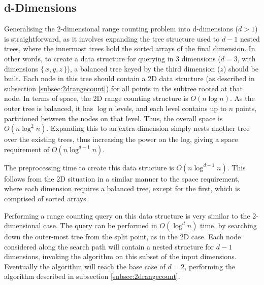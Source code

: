 \documentclass[paper=a4, fontsize=12pt]{article}
\begin{document}
\subsection{d-Dimensions}
\label{subsec:ddrangecount}

Generalising the 2-dimensional range counting problem into d-dimensions (\(d >
1\)) is straightforward, as it involves expanding the tree structure used to
\(d-1\) nested trees, where the innermost trees hold the sorted arrays of the
final dimension. In other words, to create a data structure for querying in 3
dimensions (\(d = 3\), with dimensions \(\{\,x,y,z\,\}\)), a balanced tree keyed
by the third dimension (\(z\)) should be built. Each node in this tree should
contain a 2D data structure (as described in subsection
\ref{subsec:2drangecount}) for all points in the subtree rooted at that node. In
terms of space, the 2D range counting structure is \(O(n \log n)\). As the outer
tree is balanced, it has \(\log n\) levels, and each level contains up to \(n\)
points, partitioned between the nodes on that level. Thus, the overall space is
\(O(n \log^2 n)\). Expanding this to an extra dimension simply nests another
tree over the existing trees, thus increasing the power on the log, giving a
space requirement of \(O(n \log^{d-1} n)\).

The preprocessing time to create this data structure is \(O(n \log^{d-1}
n)\). This follows from the 2D situation in a similar manner to the space
requirement, where each dimension requires a balanced tree, except for the
first, which is comprised of sorted arrays.

Performing a range counting query on this data structure is very similar to the
2-dimensional case. The query can be performed in \(O(\log^d n)\) time, by
searching down the outer-most tree from the split point, as in the 2D case. Each
node considered along the search path will contain a nested structure for \(d -
1\) dimensions, invoking the algorithm on this subset of the input
dimensions. Eventually the algorithm will reach the base case of \(d = 2\),
performing the algorithm described in subsection \ref{subsec:2drangecount}.
\end{document}
